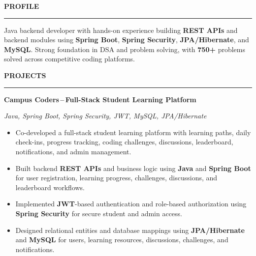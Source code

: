 \documentclass[a4paper]{article}
\newcommand{\sectionrule}[1]{%
    \vspace{2pt}%
    {\color{navy}\large\bfseries #1}\par
    \vspace{2pt}%
    {\color{navy}\rule{\linewidth}{0.70pt}}%
    \vspace{4pt}\par
}
\newcommand{\projecttitle}[1]{%
    {\color{navy}\bfseries\normalsize #1}%
}
\newcommand{\techline}[1]{%
    {\color{muted}\small\itshape #1}%
}
\newcommand{\bullets}{%
    \begin{itemize}[
        leftmargin=1.2em,
        itemsep=1.5pt,
        topsep=1.5pt,
        parsep=0pt,
        partopsep=0pt,
        label={\color{navy}\textbullet}
    ]
}
\begin{document}
\begin{minipage}[t]{135mm}

    \hspace*{6mm}%
    \begin{minipage}[t]{123mm}
        \small

        \vspace{3pt}

        \sectionrule{PROFILE}

        {\justifying
        Java backend developer with hands-on experience building \textbf{REST APIs} and backend modules using \textbf{Spring Boot}, \textbf{Spring Security}, \textbf{JPA/Hibernate}, and \textbf{MySQL}. Strong foundation in DSA and problem solving, with \textbf{750+} problems solved across competitive coding platforms.\par}

        \vspace{5pt}

        \sectionrule{PROJECTS}

        \projecttitle{Campus Coders\,--\,Full-Stack Student Learning Platform}\par
        \vspace{1pt}
        \techline{Java, Spring Boot, Spring Security, JWT, MySQL, JPA/Hibernate}\par
        \vspace{2pt}

        \bullets
            \item Co-developed a full-stack student learning platform with learning paths, daily check-ins, progress tracking, coding challenges, discussions, leaderboard, notifications, and admin management.
            \item Built backend \textbf{REST APIs} and business logic using \textbf{Java} and \textbf{Spring Boot} for user registration, learning progress, challenges, discussions, and leaderboard workflows.
            \item Implemented \textbf{JWT}-based authentication and role-based authorization using \textbf{Spring Security} for secure student and admin access.
            \item Designed relational entities and database mappings using \textbf{JPA/Hibernate} and \textbf{MySQL} for users, learning resources, discussions, challenges, and notifications.
        \end{itemize}


\end{minipage}
\end{minipage}
\end{document}
